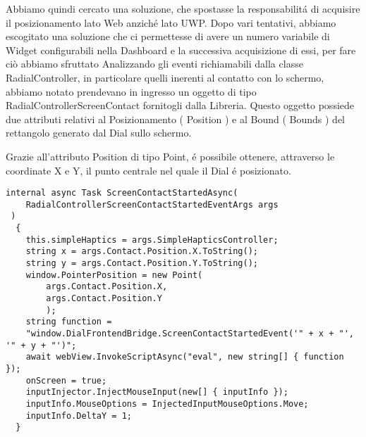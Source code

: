 Abbiamo quindi cercato una soluzione, che spostasse la responsabilitá di acquisire il posizionamento lato Web anziché lato UWP. Dopo vari tentativi, abbiamo escogitato una soluzione che ci permettesse di avere un numero variabile di Widget configurabili nella Dashboard e la successiva acquisizione di essi, per fare ciò abbiamo sfruttato
Analizzando gli eventi richiamabili dalla classe RadialController, in particolare quelli inerenti al contatto con lo schermo, abbiamo notato prendevano in ingresso un oggetto di tipo RadialControllerScreenContact fornitogli dalla Libreria. Questo oggetto possiede due attributi relativi al Posizionamento ( Position ) e al Bound ( Bounds ) del rettangolo generato dal Dial sullo schermo.

Grazie all’attributo Position di tipo Point, é possibile ottenere, attraverso le coordinate X e Y, il punto centrale nel quale il Dial é posizionato.

\vspace{1.0cm}
\begin{lstlisting}[caption={Metodo ScreenContactStartedAsync},style=javaScriptCode]
 internal async Task ScreenContactStartedAsync(
 	RadialControllerScreenContactStartedEventArgs args
 )
  {
    this.simpleHaptics = args.SimpleHapticsController;
    string x = args.Contact.Position.X.ToString();
    string y = args.Contact.Position.Y.ToString();
    window.PointerPosition = new Point(
    	args.Contact.Position.X, 
    	args.Contact.Position.Y
    	);
    string function = 
    "window.DialFrontendBridge.ScreenContactStartedEvent('" + x + "', '" + y + "')";
    await webView.InvokeScriptAsync("eval", new string[] { function });
    onScreen = true;
    inputInjector.InjectMouseInput(new[] { inputInfo });
    inputInfo.MouseOptions = InjectedInputMouseOptions.Move;
    inputInfo.DeltaY = 1;
  }
\end{lstlisting} 
\vspace{1.0cm}


